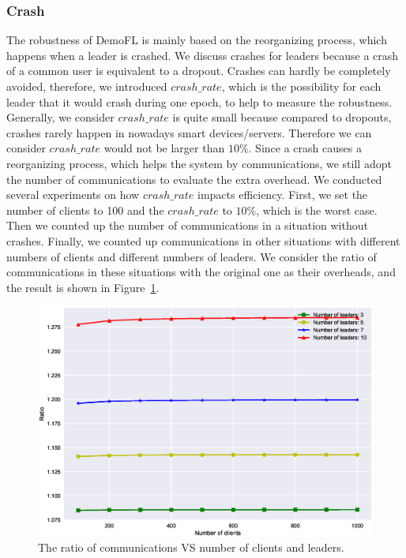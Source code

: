 \subsubsection{Crash}
The robustness of DemoFL is mainly based on the reorganizing process, which happens when a leader is crashed. We discuss crashes for leaders because a crash of a common user is equivalent to a dropout. Crashes can hardly be completely avoided, therefore, we introduced $crash\_rate$, which is the possibility for each leader that it would crash during one epoch, to help to measure the robustness. Generally, we consider $crash\_rate$ is quite small because compared to dropouts, crashes rarely happen in nowadays smart devices/servers. Therefore we can consider $crash\_rate$ would not be larger than $10\%$. Since a crash causes a reorganizing process, which helps the system by communications, we still adopt the number of communications to evaluate the extra overhead. We conducted several experiments on how $crash\_rate$ impacts efficiency. First, we set the number of clients to 100 and the $crash\_rate$ to $10\%$, which is the worst case. Then we counted up the number of communications in a situation without crashes. Finally, we counted up communications in other situations with different numbers of clients and different numbers of leaders. We consider the ratio of communications in these situations with the original one as their overheads, and the result is shown in Figure~\ref{crash-leader}. 

\begin{figure}[!ht]
    \centering
    \includegraphics[width=\columnwidth]{img/crash-leader.eps}
    \caption{The ratio of communications VS number of clients and leaders.}
    \label{crash-leader}
\end{figure}


